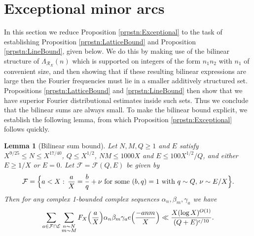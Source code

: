 \documentclass[10pt]{amsart}
\theoremstyle{plain}
\newtheorem{lmm}[thrm]{Lemma}
\numberwithin{sblmm}{thrm}
\numberwithin{equation}{section}
\begin{document}
\section{Exceptional minor arcs}\label{sec:Bilinear}
%
%
%
In this section we reduce Proposition \ref{prpstn:Exceptional} to the task of establishing Proposition \ref{prpstn:LatticeBound} and Proposition \ref{prpstn:LineBound}, given below. We do this by making use of the bilinear structure of $\Lambda_{\mathcal{R}_X}(n)$ which is supported on integers of the form $n_1n_2$ with $n_1$ of convenient size, and then showing that if these resulting bilinear expressions are large then the Fourier frequencies must lie in a smaller additively structured set. Propositions \ref{prpstn:LatticeBound} and \ref{prpstn:LineBound} then show that we have superior Fourier distributional estimates inside such sets. Thus we conclude that the bilinear sums are always small. To make the bilinear bound explicit, we establish the following lemma, from which Proposition \ref{prpstn:Exceptional} follows quickly.
%
%
%
%
\begin{lmm}[Bilinear sum bound]\label{lmm:Explicit}
Let $N,M,Q\ge 1$ and $E$ satisfy $X^{9/25}\le N\le X^{17/40}$, $Q\le X^{1/2}$, $NM\le 1000X$ and $E\le 100X^{1/2}/Q$, and either $E\ge 1/X$ or $E=0$.
Let $\mathcal{F}=\mathcal{F}(Q,E)$ be given by
\[
\mathcal{F}=\Bigl\{a<X:\, \frac{a}{X}=\frac{b}{q}+\nu\text{ for some }(b,q)=1\text{ with }q\sim Q,\,\nu\sim E/X\Bigr\}.
\]
Then for any complex 1-bounded complex sequences $\alpha_n,\beta_m,\gamma_a$ we have
\[
\sum_{a\in\mathcal{F}\cap\mathcal{E}}\sum_{\substack{n\sim N\\ m\sim M}}F_{X}\Bigl(\frac{a}{X}\Bigr)\alpha_n\beta_m\gamma_a e\Bigl(\frac{-anm}{X}\Bigr)\ll \frac{X(\log{X})^{O(1)}}{(Q+E)^{\epsilon/10}}.
\]
\end{lmm}
%
%
%
\end{document}
